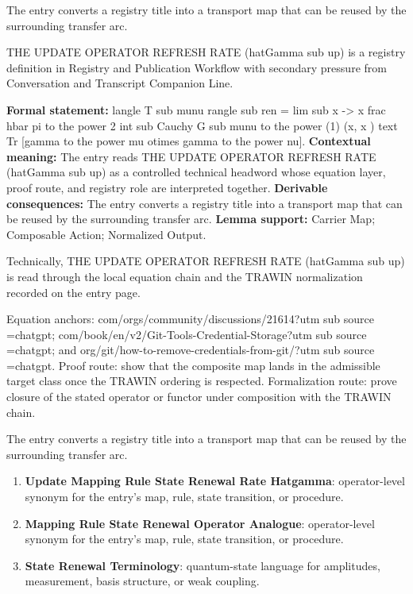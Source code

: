 The entry converts a registry title into a transport map that can be reused by the surrounding transfer arc.
\clearpage


\begingroup\small
{}
THE UPDATE OPERATOR REFRESH RATE (hatGamma sub up) is a registry definition in Registry and Publication Workflow with secondary pressure from Conversation and Transcript Companion Line.

\begingroup\footnotesize\setlength{\emergencystretch}{3em}\sloppy
\textbf{Formal statement:} langle T sub munu rangle sub ren = lim sub x -> x frac hbar pi to the power 2 int sub Cauchy G sub munu to the power (1) (x, x ) text Tr [gamma to the power mu otimes gamma to the power nu]. \textbf{Contextual meaning:} The entry reads THE UPDATE OPERATOR REFRESH RATE (hatGamma sub up) as a controlled technical headword whose equation layer, proof route, and registry role are interpreted together. \textbf{Derivable consequences:} The entry converts a registry title into a transport map that can be reused by the surrounding transfer arc. \textbf{Lemma support:} Carrier Map; Composable Action; Normalized Output.\par
\endgroup

Technically, THE UPDATE OPERATOR REFRESH RATE (hatGamma sub up) is read through the local equation chain and the TRAWIN normalization recorded on the entry page.

Equation anchors: com/orgs/community/discussions/21614?utm sub source =chatgpt; com/book/en/v2/Git-Tools-Credential-Storage?utm sub source =chatgpt; and org/git/how-to-remove-credentials-from-git/?utm sub source =chatgpt. Proof route: show that the composite map lands in the admissible target class once the TRAWIN ordering is respected. Formalization route: prove closure of the stated operator or functor under composition with the TRAWIN chain.

The entry converts a registry title into a transport map that can be reused by the surrounding transfer arc.
\endgroup

\begin{enumerate}[leftmargin=1.6em,itemsep=6pt,topsep=4pt]
\item \textbf{Update Mapping Rule State Renewal Rate Hatgamma}: operator-level synonym for the entry's map, rule, state transition, or procedure.
\item \textbf{Mapping Rule State Renewal Operator Analogue}: operator-level synonym for the entry's map, rule, state transition, or procedure.
\item \textbf{State Renewal Terminology}: quantum-state language for amplitudes, measurement, basis structure, or weak coupling.
\end{enumerate}

